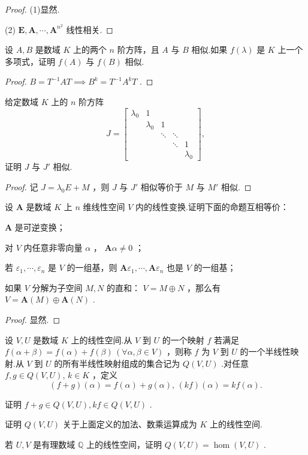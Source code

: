 \begin{proof}
	(1)显然.

	(2) $\bm E,\bm A,\cdots,\bm A^{n^2}$ 线性相关.
\end{proof}
\begin{prob}[33]
	设 $A,B$ 是数域 $K$ 上的两个 $n$ 阶方阵，且 $A$ 与 $B$ 相似.如果 $f(\lambda)$ 是 $K$ 上一个多项式，证明 $f(A)$ 与 $f(B)$ 相似.
\end{prob}
\begin{proof}
	$B=T^{-1}AT\implies B^k=T^{-1}A^kT$ .
\end{proof}
\begin{prob}[34]
	给定数域 $K$ 上的 $n$ 阶方阵
	\[
		J=\begin{bmatrix}
			\lambda_0 & 1         &        &        &           \\
			          & \lambda_0 & 1      &        &           \\
			          &           & \ddots & \ddots &           \\
			          &           &        & \ddots & 1         \\
			          &           &        &        & \lambda_0
		\end{bmatrix},
	\]
	证明 $J$ 与 $J'$ 相似.
\end{prob}
\begin{proof}
	记 $J=\lambda_0E+M$ ，则 $J$ 与 $J'$ 相似等价于 $M$ 与 $M'$ 相似.
\end{proof}
\begin{prob}[35]
	设 $\bm A$ 是数域 $K$ 上 $n$ 维线性空间 $V$ 内的线性变换.证明下面的命题互相等价：
	\begin{mylist}
		\item  $\bm A$ 是可逆变换；
		\item 对 $V$ 内任意非零向量 $\alpha$ ， $\bm A\alpha\ne0$ ；
		\item 若 $\varepsilon_1,\cdots,\varepsilon_n$ 是 $V$ 的一组基，则 $\bm A\varepsilon_1,\cdots,\bm A\varepsilon_n$ 也是 $V$ 的一组基；
		\item 如果 $V$ 分解为子空间 $M,N$ 的直和： $V=M\oplus N$ ，那么有 $V=\bm A(M)\oplus\bm A(N)$ .
	\end{mylist}
\end{prob}
\begin{proof}
	显然.
\end{proof}
\begin{prob}[36]
	设 $V,U$ 是数域 $K$ 上的线性空间.从 $V$ 到 $U$ 的一个映射 $f$ 若满足 $f(\alpha+\beta)=f(\alpha)+f(\beta)\,(\forall\alpha,\beta\in V)$ ，则称 $f$ 为 $V$ 到 $U$ 的一个{\heiti 半线性映射}.从 $V$ 到 $U$ 的所有半线性映射组成的集合记为 $Q(V,U)$ .对任意 $f,g\in Q(V,U),\,k\in K$ ，定义
	\[
		(f+g)(\alpha)=f(\alpha)+g(\alpha),\,(kf)(\alpha)=kf(\alpha).
	\]
	\begin{mylist}
		\item 证明 $f+g\in Q(V,U),kf\in Q(V,U)$ .
		\item 证明 $Q(V,U)$ 关于上面定义的加法、数乘运算成为 $K$ 上的线性空间.
		\item 若 $U,V$ 是有理数域 $\mathbb{Q}$ 上的线性空间，证明 $Q(V,U)=\hom(V,U)$ .
	\end{mylist}
\end{prob}
